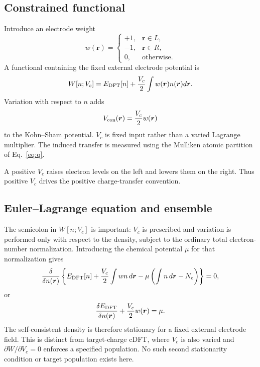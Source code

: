 \documentclass[11pt,a4paper]{article}
\begin{document}
\subsection{Constrained functional}

Introduce an electrode weight
\begin{equation}
 w(\bm r)=\begin{cases}
 +1,&\bm r\in L,\\-1,&\bm r\in R,\\0,&\text{otherwise}.
 \end{cases}
\end{equation}
A functional containing the fixed external electrode potential is
\begin{equation}
 W[n;V_c]=E_{\rm DFT}[n]+\frac{V_c}{2}\int w(\bm r)n(\bm r)d\bm r.
\end{equation}
Variation with respect to $n$ adds
\begin{equation}
 V_{\rm con}(\bm r)=\frac{V_c}{2}w(\bm r)
\end{equation}
to the Kohn--Sham potential. $V_c$ is fixed input rather than a varied
Lagrange multiplier. The induced transfer is measured using the Mulliken
atomic partition of Eq.~\eqref{eq:q}.

A positive $V_c$ raises electron levels on the left and lowers them on the
right. Thus positive $V_c$ drives the positive charge-transfer convention.

\subsection{Euler--Lagrange equation and ensemble}

The semicolon in $W[n;V_c]$ is important: $V_c$ is prescribed and variation
is performed only with respect to the density, subject to the ordinary total
electron-number normalization. Introducing the chemical potential $\mu$ for
that normalization gives
\begin{equation}
 \frac{\delta}{\delta n(\bm r)}
 \left\{E_{\rm DFT}[n]+\frac{V_c}{2}\int w n\,d\bm r
 -\mu\left(\int n\,d\bm r-N_e\right)\right\}=0,
\end{equation}
or
\begin{equation}
 \frac{\delta E_{\rm DFT}}{\delta n(\bm r)}+\frac{V_c}{2}w(\bm r)=\mu.
 \label{eq:euler-fixed-vc}
\end{equation}
The self-consistent density is therefore stationary for a fixed external
electrode field. This is distinct from target-charge cDFT, where $V_c$ is
also varied and $\partial W/\partial V_c=0$ enforces a specified population.
No such second stationarity condition or target population exists here.
\end{document}
